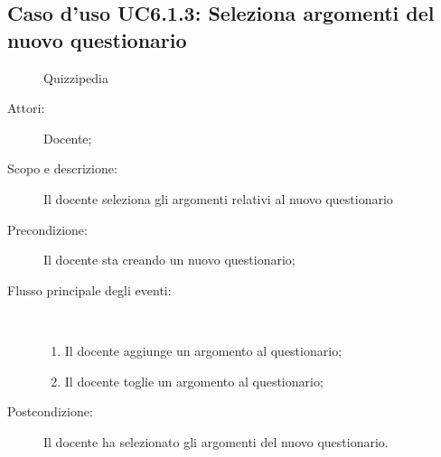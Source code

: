 \subsection{Caso d'uso UC6.1.3: Seleziona argomenti del nuovo questionario}
	\begin{figure}[H]
		\centering
		\begin{resizedtikzpicture}{\textwidth}
		\begin{umlsystem}[x=0, fill=lightgray!20]{Quizzipedia}
		\end{umlsystem}
		\end{resizedtikzpicture}
		\caption{}
	\end{figure}
\begin{description}
\item[Attori:] Docente;
\item[Scopo e descrizione:] Il docente seleziona gli argomenti relativi al nuovo questionario 
      \item[Precondizione:] Il docente sta creando un nuovo questionario;

        \item[Flusso principale degli eventi:] \ 
 \begin{enumerate}
          \item Il docente aggiunge un argomento al questionario;
          \item Il docente toglie un argomento al questionario;

      \end{enumerate}
    \item[Postcondizione:] Il docente ha selezionato gli argomenti del nuovo questionario.
  \end{description}
\hypertarget{UC6.2}{}
